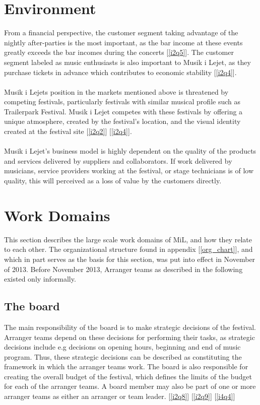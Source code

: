 \section{Environment}
From a financial perspective, the customer segment taking advantage of the nightly after-parties is the most important, as the bar income at these events greatly exceeds the bar incomes during the concerts [\ref{i2q5}]. The customer segment labeled as music enthusiasts is also important to Musik i Lejet, as they purchase tickets in advance which contributes to economic stability [\ref{i2q4}].
\\ \\
Musik i Lejets position in the markets mentioned above is threatened by competing festivals, particularly festivals with similar musical profile such as Trailerpark Festival. Musik i Lejet competes with these festivals by offering a unique atmosphere, created by the festival's location, and the visual identity created at the festival site [\ref{i2q2}] [\ref{i2q4}].
\\ \\
Musik i Lejet's business model is highly dependent on the quality of the products and services delivered by suppliers and collaborators. If work delivered by musicians, service providers working at the festival, or stage technicians is of low quality, this will perceived as a loss of value by the customers directly. 

\section{Work Domains}
\label{sec:work_domains}
This section describes the large scale work domains of MiL, and how they relate to each other. The organizational structure found in appendix [\ref{org_chart}], and which in part serves as the basis for this section, was put into effect in November of 2013. Before November 2013, Arranger teams as described in the following existed only informally.
\subsection{The board}
\label{sub:the_board}
The main responsibility of the board is to make strategic decisions of the festival. Arranger teams depend on these decisions for performing their tasks, as strategic decisions include e.g decisions on opening hours, beginning and end of music program. Thus, these strategic decisions can be described as constituting the framework in which the arranger teams work. The board is also responsible for creating the overall budget of the festival, which defines the limits of the budget for each of the arranger teams. A board member may also be part of one or more arranger teams as either an arranger or team leader. [\ref{i2q8}] [\ref{i2q9}] [\ref{i4q4}]

